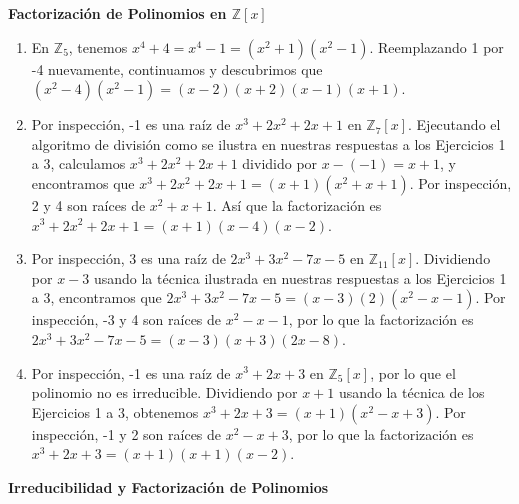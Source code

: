 \textbf{Factorización de Polinomios en \(\mathbb{Z}[x]\)}
	
\begin{enumerate}
	\item En \(\mathbb{Z}_5\), tenemos \(x^4 + 4 = x^4 - 1 = (x^2 + 1)(x^2 - 1)\). Reemplazando 1 por -4 nuevamente, continuamos y descubrimos que \((x^2 - 4)(x^2 - 1) = (x - 2)(x + 2)(x - 1)(x + 1)\).
		
	\item Por inspección, -1 es una raíz de \(x^3 + 2x^2 + 2x + 1\) en \(\mathbb{Z}_7[x]\). Ejecutando el algoritmo de división como se ilustra en nuestras respuestas a los Ejercicios 1 a 3, calculamos \(x^3+2x^2+2x+1\) dividido por \(x - (-1) = x + 1\), y encontramos que \(x^3+2x^2+2x+1 = (x+1)(x^2+x+1)\). Por inspección, 2 y 4 son raíces de \(x^2 + x + 1\). Así que la factorización es \(x^3+2x^2+2x+1 = (x+1)(x-4)(x-2)\).
		
	\item Por inspección, 3 es una raíz de \(2x^3 + 3x^2 - 7x - 5\) en \(\mathbb{Z}_{11}[x]\). Dividiendo por \(x - 3\) usando la técnica ilustrada en nuestras respuestas a los Ejercicios 1 a 3, encontramos que \(2x^3+3x^2-7x-5 = (x-3)(2)(x^2-x-1)\). Por inspección, -3 y 4 son raíces de \(x^2 - x - 1\), por lo que la factorización es \(2x^3+3x^2-7x-5 = (x-3)(x+3)(2x-8)\).
		
	\item Por inspección, -1 es una raíz de \(x^3 + 2x + 3\) en \(\mathbb{Z}_5[x]\), por lo que el polinomio no es irreducible. Dividiendo por \(x + 1\) usando la técnica de los Ejercicios 1 a 3, obtenemos \(x^3+2x+3 = (x+1)(x^2-x+3)\). Por inspección, -1 y 2 son raíces de \(x^2 - x + 3\), por lo que la factorización es \(x^3+2x+3=(x+1)(x+1)(x-2)\).
\end{enumerate}
	
\textbf{Irreducibilidad y Factorización de Polinomios}
	
